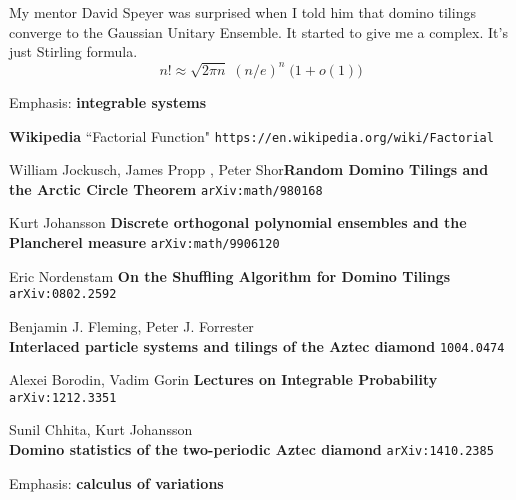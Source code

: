 \documentclass[12pt]{article}
\begin{document}
\newpage

\noindent My mentor David Speyer was surprised when I told him that domino tilings converge to the Gaussian Unitary Ensemble.  It started to give me a complex.  It's just Stirling formula.
$$ n! \approx \sqrt{2\pi n} \;(n/e)^n \; \big(1 + o(1) \big)$$

\newpage

\noindent Emphasis:  \textbf{integrable systems}


\selectfont \fontsize{12}{10}\selectfont

\begin{thebibliography}{}

\item \textbf{Wikipedia} ``Factorial Function" \texttt{https://en.wikipedia.org/wiki/Factorial}

\item William Jockusch, James Propp , Peter Shor\textbf{Random Domino Tilings and the Arctic Circle Theorem} \texttt{arXiv:math/980168}

\item Kurt Johansson \textbf{Discrete orthogonal polynomial ensembles and the Plancherel measure} \texttt{arXiv:math/9906120}

\item Eric Nordenstam \textbf{On the Shuffling Algorithm for Domino Tilings} \texttt{arXiv:0802.2592}

\item Benjamin J. Fleming, Peter J. Forrester \\ \textbf{Interlaced particle systems and tilings of the Aztec diamond} \texttt{1004.0474}

\item Alexei Borodin, Vadim Gorin \textbf{Lectures on Integrable Probability} \texttt{arXiv:1212.3351}

\item Sunil Chhita, Kurt Johansson \\ \textbf{Domino statistics of the two-periodic Aztec diamond} \texttt{arXiv:1410.2385}

\end{thebibliography}

\selectfont \fontsize{20}{25}\selectfont

\noindent Emphasis:  \textbf{calculus of variations}


\selectfont \fontsize{12}{10}\selectfont

\begin{thebibliography}{}

\item 

\end{thebibliography}

\selectfont \fontsize{20}{25}\selectfont
\end{document}
